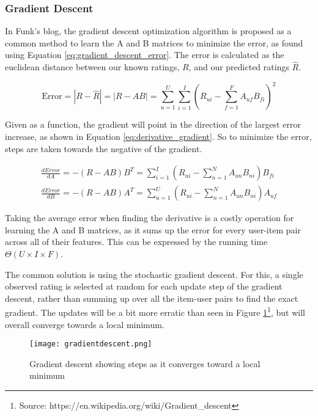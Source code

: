 \subsubsection{Gradient Descent}
In Funk's blog, the gradient descent optimization algorithm is proposed as a common method to learn the A and B matrices to minimize the error, as found using Equation \ref{eq:gradient_descent_error}. The error is calculated as the euclidean distance between our known ratings, $R$, and our predicted ratings $\hat{R}$\cite{aibook_gradientdescent_localsearch}.

\begin{equation}\label{eq:gradient_descent_error}
\text{Error} = |R-\hat{R}| = |R - AB| = \sum_{u=1}^{U}\sum_{i=1}^{I}\left (R_{ui}- \sum_{f=1}^{F} A_{uf}B_{fi} \right )^2
\end{equation}

Given as a function, the gradient will point in the direction of the largest error increase, as shown in Equation \ref{eq:derivative_gradient}. So to minimize the error, steps are taken towards the negative of the gradient\cite{aibook_gradientdescent_linearfunc}.

\begin{equation}\label{eq:derivative_gradient}
	\begin{split}
	\frac{dError}{dA}=-(R-AB)B^T = \sum_{i=1}^{I}(R_{ui} - \sum_{n=1}^{N} A_{un}B_{ni})B_{fi}
	\\
	\frac{dError}{dB}=-(R-AB)A^T = \sum_{u=1}^{U}(R_{ui} - \sum_{n=1}^{N} A_{un}B_{ni})A_{uf}
	\end{split}
\end{equation}

Taking the average error when finding the derivative is a costly operation for learning the A and B matrices, as it sums up the error for every user-item pair across all of their features. This can be expressed by the running time $\Theta(U\times I \times F)$.

The common solution is using the stochastic gradient descent. For this, a single observed rating is selected at random for each update step of the gradient descent, rather than summing up over all the item-user pairs to find the exact gradient. The updates will be a bit more erratic than seen in Figure \ref{fig:gradientDescent}\footnote{Source: https://en.wikipedia.org/wiki/Gradient\_descent\label{ftn:wikifigure}}, but will overall converge towards a local minimum.

\begin{figure}
	\centering
	\texttt{[image: gradientdescent.png]}
	\caption{Gradient descent showing steps as it converges toward a local minimum}
	\label{fig:gradientDescent}
\end{figure}

